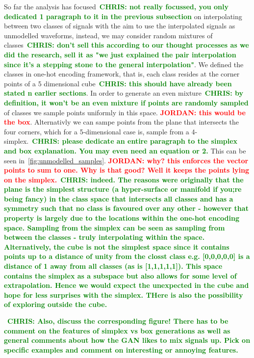 \documentclass[12pt]{iopart}
\newcommand{\jordan}[1]{\textbf{\textcolor{red}{JORDAN: #1}}}
\newcommand{\chris}[1]{\textbf{\textcolor{green}{CHRIS: #1}}}
\begin{document}
So far the analysis has focused~\chris{not really focussed, you only dedicated
1 paragraph to it in the previous subsection} on interpolating between two
classes of signals with the aim to use the interpolated signals as unmodelled
waveforms, instead, we may consider random mixtures of classes~\chris{don't
sell this according to our thought processes as we did the research, sell it as
"we just explained the pair interpolation since it's a stepping stone to the
general interpolation"}. We defined the classes in one-hot encoding framework,
that is, each class resides at the corner points of a 5 dimensional
cube~\chris{this should have already been stated n earlier sections}. In order
to generate an even mixture~\chris{by definition, it won't be an even mixture
if points are randomly sampled} of classes we sample points uniformly in this
space. \jordan{this would be the box}. Alternativly we can sampe points from
the plane that intersects the four corners, which for a 5-dimensional case is,
sample from a 4-simplex.~\chris{please dedicate an entire paragraph to the
simplex and box explanation. You may even need an equation or 2.} This can be
seen in~\ref{fig:unmodelled_samples}. \jordan{why? this enforces the vector
points to sum to one. Why is that good? Well it keeps the points lying on the
simplex.}~\chris{indeed. The reasons were originally that the plane is the
simplest structure (a hyper-surface or manifold if you;re being fancy) in the
class space that intersects all classes and has a symmetry such that no class
is favoured over any other - however that property is largely due to the
locations within the one-hot encoding space. Sampling from the simplex can be
seen as sampling from between the classes - truly interpolating within the
space. Alternatively, the cube is not the simplest space since it contains
points up to a distance of unity from the closst class e.g. [0,0,0,0,0] is a
distance of 1 away from all classes (as is [1,1,1,1,1]). This space contains
the simplex as a subspace but also allows for some level of extrapolation.
Hence we would expect the unexpected in the cube and hope for less surprises
with the simplex. THere is also the possibility of exploring outside the cube.
} 

~\chris{Also, discuss the corresponding figure! There has to be comment on the
features of simplex vs box generations as well as general comments about how
the GAN likes to mix signals up. Pick on specific examples and comment on
interesting or annoying features.}
\end{document}
